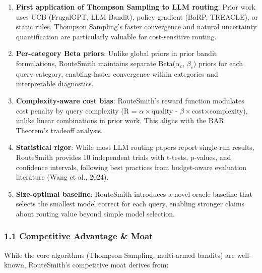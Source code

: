 \documentclass[
]{article}
\begin{document}
\begin{enumerate}
\def\labelenumi{\arabic{enumi}.}
\item
  \textbf{First application of Thompson Sampling to LLM routing}: Prior
  work uses UCB (FrugalGPT, LLM Bandit), policy gradient (BaRP,
  TREACLE), or static rules. Thompson Sampling's faster convergence and
  natural uncertainty quantification are particularly valuable for
  cost-sensitive routing.
\item
  \textbf{Per-category Beta priors}: Unlike global priors in prior
  bandit formulations, RouteSmith maintains separate Beta(\(\alpha_c\),
  \(\beta_c\)) priors for each query category, enabling faster
  convergence within categories and interpretable diagnostics.
\item
  \textbf{Complexity-aware cost bias}: RouteSmith's reward function
  modulates cost penalty by query complexity (R =
  \(\alpha\times\)quality - \(\beta\times\)cost×complexity), unlike
  linear combinations in prior work. This aligns with the BAR Theorem's
  tradeoff analysis.
\item
  \textbf{Statistical rigor}: While most LLM routing papers report
  single-run results, RouteSmith provides 10 independent trials with
  t-tests, p-values, and confidence intervals, following best practices
  from budget-aware evaluation literature (Wang et al., 2024).
\item
  \textbf{Size-optimal baseline}: RouteSmith introduces a novel oracle
  baseline that selects the smallest model correct for each query,
  enabling stronger claims about routing value beyond simple model
  selection.
\end{enumerate}

\hypertarget{competitive-advantage-moat}{%
\subsubsection{1.1 Competitive Advantage \&
Moat}\label{competitive-advantage-moat}}

While the core algorithms (Thompson Sampling, multi-armed bandits) are
well-known, RouteSmith's competitive moat derives from:
\end{document}
